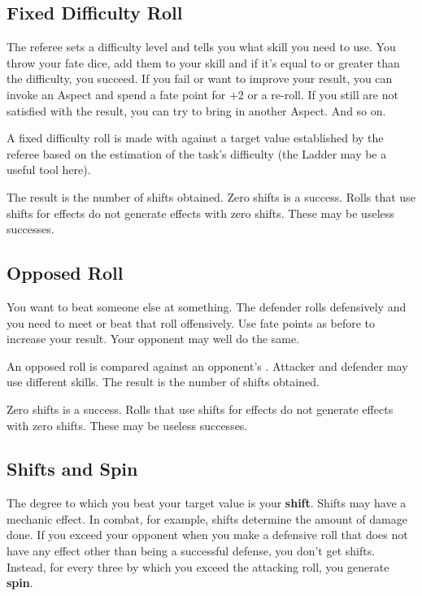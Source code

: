 \subsection{Fixed Difficulty Roll}
\label{sec:fixed-difficulty-roll}

The referee sets a difficulty level and tells you what skill you need to use. You throw your fate dice, add them to your skill and if it's equal to or greater than the difficulty, you succeed. If you fail or want to improve your result, you can invoke an Aspect and spend a fate point for +2 or a re-roll. If you still are not satisfied with the result, you can try to bring in another Aspect. And so on.

A fixed difficulty roll is made with \dplusskill{} against a target value established by the referee based on the estimation of the task's difficulty (the Ladder may be a useful tool here).

The result is the number of shifts obtained.  Zero shifts is a success. Rolls that use shifts for effects do not generate effects with zero shifts. These may be useless successes.


\subsection{Opposed Roll}
\label{sec:opposed-roll}

You want to beat someone else at something. The defender rolls defensively and you need to meet or beat that roll offensively. Use fate points as before to increase your result. Your opponent may well do the same.

An opposed roll is \dplusskill{} compared against an opponent's \dplusskill. Attacker and defender may use different skills. The result is the number of shifts obtained.

Zero shifts is a success. Rolls that use shifts for effects do not generate effects with zero shifts. These may be useless successes.

\subsection{Shifts and Spin}
\label{sec:shifts-and-spin}

The degree to which you beat your target value is your \textbf{shift}. Shifts may have a mechanic effect. In combat, for example, shifts determine the amount of damage done. If you exceed your opponent when you make a defensive roll that does not have any effect other than being a successful defense, you don't get shifts. Instead, for every three by which you exceed the attacking roll, you generate \textbf{spin}.


